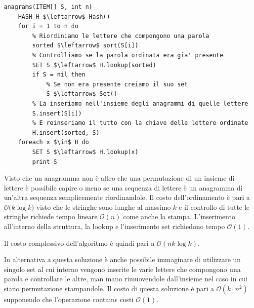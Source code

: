 \documentclass[../cheatSheetAlgoritmi.tex]{subfiles}
\begin{document}
\begin{lstlisting}[caption=anagrammi]
anagrams(ITEM[] S, int n)
	HASH H $\leftarrow$ Hash()
	for i = 1 to n do
		% Riordiniamo le lettere che compongono una parola
		sorted $\leftarrow$ sort(S[i])
		% Controlliamo se la parola ordinata era gia' presente
		SET S $\leftarrow$ H.lookup(sorted)
		if S = nil then
			% Se non era presente creiamo il suo set
			S $\leftarrow$ Set()
		% La inseriamo nell'insieme degli anagrammi di quelle lettere
		S.insert(S[i])
		% E reinseriamo il tutto con la chiave delle lettere ordinate
		H.insert(sorted, S)
	foreach x $\in$ H do
		SET S $\leftarrow$ H.lookup(x)
		print S
\end{lstlisting}
Visto che un anagramma non è altro che una permutazione di un insieme di lettere è possibile capire o meno se una sequenza di lettere è un anagramma di un'altra sequenza semplicemente riordinandole. Il costo dell'ordinamento è pari a $\mathcal{O}(k \log{k}$) visto che le stringhe sono lunghe al massimo $k$ e il controllo di tutte le stringhe richiede tempo lineare $\mathcal{O}(n)$ come anche la stampa. L'inserimento all'interno della struttura, la lookup e l'inserimento set richiedono tempo $\mathcal{O}(1)$.

Il costo complessivo dell'algoritmo è quindi pari a $\mathcal{O}(nk \log{k})$.

In alternativa a questa soluzione è anche possibile immaginare di utilizzare un singolo set al cui interno vengono inserite le varie lettere che compongono una parola e controllare le altre, man mano rimuovendole dall'insieme nel caso in cui siano permutazione stampandole. Il costo di questa soluzione è pari a $\mathcal{O}(k \cdot n^{2})$ supponendo che l'operazione contains costi $\mathcal{O}(1)$.
 
\end{document}
